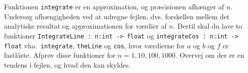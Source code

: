 Funktionen \lstinline{integrate} er en approximation, og præcisionen afhænger af $n$. Undersøg afhængigheden ved at udregne fejlen, dvs. forskellen mellem det analytiske resultat og approximationen for værdier af $n$. Dertil skal du lave to funktioner \lstinline{IntegrateLine : n:int -> float} og \lstinline{integrateCos : n:int -> float} vha.\ \lstinline{integrate}, \lstinline{theLine} og \lstinline{cos}, hvor værdierne for $a$ og $b$ og $f$ er fastlåste. Afprøv disse funktioner for $n = 1, 10, 100, 1000$. Overvej om der er en tendens i fejlen, og hvad den kan skyldes.